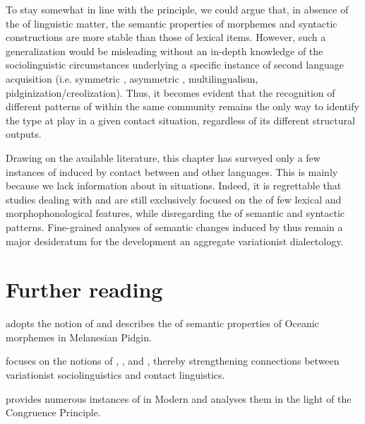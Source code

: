 \documentclass[output=paper]{langsci/langscibook}
\begin{document}
To stay somewhat in line with the  principle, we could argue that, in absence of the  of linguistic matter, the semantic properties of morphemes and syntactic constructions are more stable than those of lexical items. However, such a generalization would be misleading without an in-depth knowledge of the sociolinguistic circumstances underlying a specific instance of second language acquisition (i.e. symmetric , asymmetric , multilingualism, pidginization/creolization). Thus, it becomes evident that the recognition of different patterns of  within the same community remains the only way to identify the  type at play in a given contact situation, regardless of its different structural outputs.  

Drawing on the available literature, this chapter has surveyed only a few instances of   induced by contact between  and other languages. This is mainly because we lack information about  in  situations. Indeed, it is regrettable that studies dealing with  and   are still exclusively focused on the  of few lexical and morphophonological features, while disregarding the  of semantic and syntactic patterns. Fine-grained analyses of semantic changes induced by  thus remain a major desideratum for the development an aggregate variationist  dialectology.  

\section*{Further reading}
\begin{furtherreading}
\item[\citet{Keesing1988}] adopts the notion of  and describes the  of semantic properties of Oceanic morphemes in Melanesian Pidgin.
\item[\citet{Meyerhoff2009}] focuses on the notions of , , and , thereby strengthening connections between variationist sociolinguistics and contact linguistics.
\item[\citet{Zuckermann2009}] provides numerous instances of  in Modern  and analyses them in the light of the Congruence Principle.
\end{furtherreading}
\end{document}

